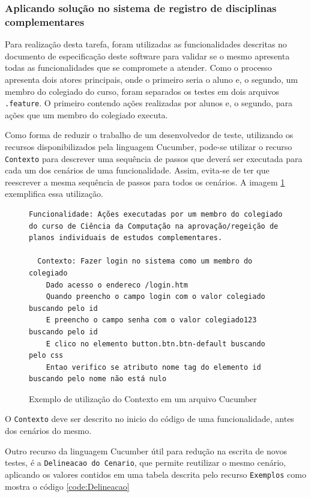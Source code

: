 \documentclass[tg]{mdtufsm}
\begin{document}
\subsubsection{Aplicando solução no sistema de registro de disciplinas complementares}
Para realização desta tarefa, foram utilizadas as funcionalidades descritas no documento de especificação deste software para validar se o mesmo apresenta todas as funcionalidades que se compromete a atender.
Como o processo apresenta dois atores principais, onde o primeiro seria o aluno e, o segundo, um membro do colegiado do curso, foram separados os testes em dois arquivos \texttt{.feature}. O primeiro contendo ações realizadas por alunos e, o segundo, para ações que um membro do colegiado executa.

Como forma de reduzir o trabalho de um desenvolvedor de teste, utilizando os recursos disponibilizados pela linguagem Cucumber, pode-se utilizar o recurso \texttt{Contexto} para descrever uma sequência de passos que deverá ser executada para cada um dos cenários de uma funcionalidade. Assim, evita-se de ter que reescrever a mesma sequência de passos para todos os cenários. A imagem \ref{code:Contexto} exemplifica essa utilização.

\begin{figure}[!htt]
	\begin{lstlisting}
Funcionalidade: Ações executadas por um membro do colegiado do curso de Ciência da Computação na aprovação/regeição de planos individuais de estudos complementares.

  Contexto: Fazer login no sistema como um membro do colegiado
    Dado acesso o endereco /login.htm
    Quando preencho o campo login com o valor colegiado buscando pelo id
    E preencho o campo senha com o valor colegiado123 buscando pelo id
    E clico no elemento button.btn.btn-default buscando pelo css
    Entao verifico se atributo nome tag do elemento id buscando pelo nome não está nulo
	\end{lstlisting}
	\caption{Exemplo de utilização do Contexto em um arquivo Cucumber}
	\label{code:Contexto}
\end{figure}

O \texttt{Contexto} deve ser descrito no inicio do código de uma funcionalidade, antes dos cenários do mesmo.

Outro recurso da linguagem Cucumber útil para redução na escrita de novos testes, é a \texttt{Delineacao do Cenario}, que permite reutilizar o mesmo cenário, aplicando os
valores contidos em uma tabela descrita pelo recurso \texttt{Exemplos} como mostra o código \ref{code:Delineacao}
\end{document}
